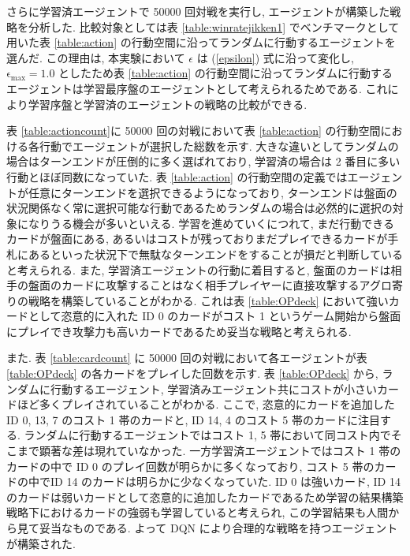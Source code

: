 \documentclass[12pt]{jarticle}
\begin{document}
  さらに学習済エージェントで 50000 回対戦を実行し, エージェントが構築した戦略を分析した. 比較対象としては表 \ref{table:winratejikken1} でベンチマークとして用いた表 \ref{table:action} の行動空間に沿ってランダムに行動するエージェントを選んだ. この理由は, 本実験において $\epsilon$ は (\ref{epsilon}) 式に沿って変化し, $\mathrm{\epsilon_{max}} = 1.0$ としたため表 \ref{table:action} の行動空間に沿ってランダムに行動するエージェントは学習最序盤のエージェントとして考えられるためである. これにより学習序盤と学習済のエージェントの戦略の比較ができる.\par
  表 \ref{table:actioncount}に 50000 回の対戦において表 \ref{table:action} の行動空間における各行動でエージェントが選択した総数を示す. 大きな違いとしてランダムの場合はターンエンドが圧倒的に多く選ばれており, 学習済の場合は 2 番目に多い行動とほぼ同数になっていた. 表 \ref{table:action} の行動空間の定義ではエージェントが任意にターンエンドを選択できるようになっており, ターンエンドは盤面の状況関係なく常に選択可能な行動であるためランダムの場合は必然的に選択の対象になりうる機会が多いといえる. 学習を進めていくにつれて, まだ行動できるカードが盤面にある, あるいはコストが残っておりまだプレイできるカードが手札にあるといった状況下で無駄なターンエンドをすることが損だと判断していると考えられる. 
  また, 学習済エージェントの行動に着目すると, 盤面のカードは相手の盤面のカードに攻撃することはなく相手プレイヤーに直接攻撃するアグロ寄りの戦略を構築していることがわかる. これは表 \ref{table:OPdeck} において強いカードとして恣意的に入れた ID 0 のカードがコスト 1 というゲーム開始から盤面にプレイでき攻撃力も高いカードであるため妥当な戦略と考えられる. \par
  また. 表 \ref{table:cardcount} に 50000 回の対戦において各エージェントが表 \ref{table:OPdeck} の各カードをプレイした回数を示す. 表 \ref{table:OPdeck} から, ランダムに行動するエージェント, 学習済みエージェント共にコストが小さいカードほど多くプレイされていることがわかる. ここで, 恣意的にカードを追加した ID 0, 13, 7 のコスト 1 帯のカードと, ID 14, 4 のコスト 5 帯のカードに注目する. ランダムに行動するエージェントではコスト 1, 5 帯において同コスト内でそこまで顕著な差は現れていなかった. 一方学習済エージェントではコスト 1 帯のカードの中で ID 0 のプレイ回数が明らかに多くなっており, コスト 5 帯のカードの中でID 14 のカードは明らかに少なくなっていた.
   ID 0 は強いカード, ID 14 のカードは弱いカードとして恣意的に追加したカードであるため学習の結果構築戦略下におけるカードの強弱も学習していると考えられ, この学習結果も人間から見て妥当なものである.
  よって DQN により合理的な戦略を持つエージェントが構築された.
\end{document}
